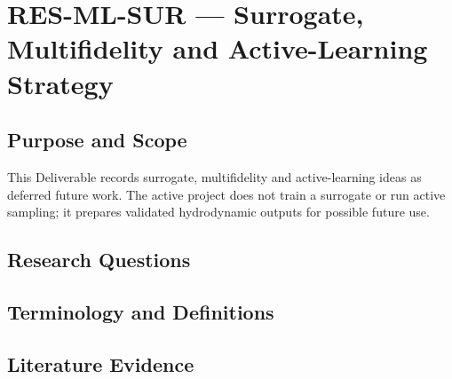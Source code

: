 
\section{RES-ML-SUR --- Surrogate, Multifidelity and Active-Learning Strategy}
\label{sec:res-ml-sur}

\subsection{Purpose and Scope}
\label{sec:res-ml-sur-purpose}

This Deliverable records surrogate, multifidelity and active-learning
ideas as deferred future work. The active project does not train a
surrogate or run active sampling; it prepares validated hydrodynamic
outputs for possible future use.

\subsection{Research Questions}
\label{sec:res-ml-sur-research-questions}


\subsection{Terminology and Definitions}
\label{sec:res-ml-sur-definitions}


\subsection{Literature Evidence}
\label{sec:res-ml-sur-literature-evidence}

%

